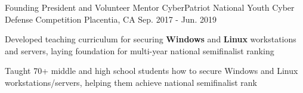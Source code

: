 \begin{cventries}
  \cventry
    {Founding President and Volunteer Mentor} %
    {CyberPatriot National Youth Cyber Defense Competition} %
    {Placentia, CA} %
    {Sep. 2017 - Jun. 2019} %
    {
      \begin{cvitems} %
        \item {Developed teaching curriculum for securing \textbf{Windows} and \textbf{Linux} workstations and servers, laying foundation for multi-year national semifinalist ranking}
        \item {Taught 70+ middle and high school students how to secure Windows and Linux workstations/servers, helping them achieve national semifinalist rank}
      \end{cvitems}
    }

\end{cventries}
